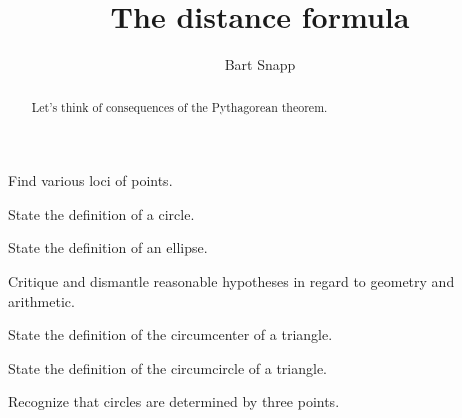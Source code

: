 \documentclass[nooutcomes,noauthor,handout]{ximera}
\title{The distance formula}
\author{Bart Snapp}
\begin{document}
\begin{abstract}
  Let's think of consequences of the Pythagorean theorem.
\end{abstract}
\maketitle


\begin{listOutcomes}
\item Find various loci of points.
\item State the definition of a circle.
\item State the definition of an ellipse.
\item{Critique and dismantle reasonable hypotheses in regard to geometry and arithmetic.}
\item State the definition of the circumcenter of a triangle.
\item State the definition of the circumcircle of a triangle.
\item Recognize that circles are determined by three points.
\end{listOutcomes}


\mynewpage
\end{document}
